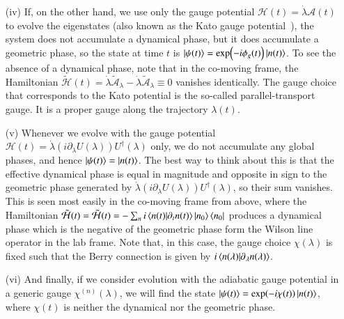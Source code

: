\begin{enumerate}
    \item[(iv)] If, on the other hand, we use only the gauge potential $\mathcal{H}(t)=\dot\lambda\mathcal{A}(t)$ to evolve the eigenstates (also known as the Kato gauge potential~\cite{Kato1950}), the system does not accumulate a dynamical phase, but it does accumulate a geometric phase, so the state at time $t$ is $\ket{\psi(t)}=\exp(-i\phi_g(t))\ket{n(t)}$. To see the absence of a dynamical phase, note that in the co-moving frame, the Hamiltonian $\tilde{\mathcal H}(t) = \dot\lambda\tilde{\mathcal{A}}_\lambda - \dot\lambda\tilde{\mathcal{A}}_\lambda \equiv 0$ vanishes identically.
    The gauge choice that corresponds to the Kato potential is the so-called parallel-transport gauge. It is a proper gauge along the trajectory $\lambda(t)$. 

    \item[(v)] Whenever we evolve with the gauge potential $\mathcal{H}(t)=\dot\lambda(i\partial_\lambda U(\lambda))U^\dagger(\lambda)$ only, we do not accumulate any global phases, and hence $\ket{\psi(t)}=\ket{n(t)}$. The best way to think about this is that the effective dynamical phase is equal in magnitude and opposite in sign to the geometric phase generated by $\dot\lambda(i\partial_\lambda U(\lambda))U^\dagger(\lambda)$, so their sum vanishes. This is seen most easily in the co-moving frame from above, where the Hamiltonian $\tilde{\mathcal{H}}(t)=\tilde{\mathcal H}(t)= - \sum_{n} i\bra{n(t)}\ket{\partial_t n(t)}\ket{n_0}\bra{n_0}$ produces a dynamical phase which is the negative of the geometric phase form the Wilson line operator in the lab frame. Note that, in this case, the gauge choice $\chi(\lambda)$ is fixed such that the Berry connection is given by $i\bra{n(\lambda)}\ket{\partial_\lambda n(\lambda)}$. 

    \item[(vi)] And finally, if we consider evolution with the adiabatic gauge potential in a generic gauge $\chi^{(n)}(\lambda)$, we will find the state $\ket{\psi(t)}=\exp(-i\chi(t))\ket{n(t)}$, where $\chi(t)$ is neither the dynamical nor the geometric phase. 
\end{enumerate}




